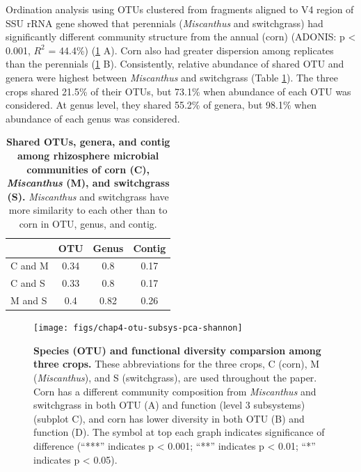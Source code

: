 \documentclass[]{msu-thesis}
\begin{document}
Ordination analysis using OTUs clustered from fragments aligned to V4
region of SSU rRNA gene showed that perennials (\textit{Miscanthus} and
switchgrass) had significantly different community structure from the
annual (corn) (ADONIS: p < 0.001, $R^2$ = 44.4\%) (\cref{fig:chap4Fig1}
A). Corn also had greater dispersion among replicates than the
perennials (\cref{fig:chap4Fig1} B). Consistently, relative abundance of
shared OTU and genera were highest between \textit{Miscanthus} and switchgrass
(Table \ref{tab:chap4TabS3}). The three crops shared 21.5\% of their
OTUs, but 73.1\% when abundance of each OTU was considered. At genus
level, they shared 55.2\% of genera, but 98.1\% when abundance of each
genus was considered.



\begin{table}[htbp]
  \centering
  \caption[Shared OTUs, genera, and contig among rhizosphere microbial
  communities of corn (C), \textit{Miscanthus} (M), and switchgrass
(S)]{\textbf{Shared OTUs, genera, and contig among rhizosphere microbial
  communities of corn (C), \textit{Miscanthus} (M), and switchgrass
(S).} \textit{Miscanthus} and switchgrass have more similarity to each
other than to corn in OTU, genus, and contig.}
    \begin{tabular}{|lccc|}
    \toprule
          & OTU   & Genus & Contig \\
    \midrule
    C and M & 0.34  & 0.8   & 0.17 \\
    C and S & 0.33  & 0.8   & 0.17 \\
    M and S & 0.4   & 0.82  & 0.26 \\
    \bottomrule
    \end{tabular}%
  \label{tab:chap4TabS3}%
\end{table}%





\begin{figure}[tbph!]
  \centering
  \texttt{[image: figs/chap4-otu-subsys-pca-shannon]}
  \caption[Species (OTU) and functional diversity comparsion among three
  crops]{\textbf{Species (OTU) and functional diversity comparsion among
  three crops.} These abbreviations for the three crops, C (corn), M
  (\textit{Miscanthus}), and S (switchgrass), are used throughout the
  paper. Corn has a different community composition from
  \textit{Miscanthus} and switchgrass in both OTU (A) and function
(level 3 subsystems) (subplot C), and corn has lower diversity in both
OTU (B) and function (D). The symbol at top each graph indicates
significance of difference (``***'' indicates p < 0.001; ``**''
indicates p < 0.01; ``*'' indicates p < 0.05).}
  \label{fig:chap4Fig1}
\end{figure}
\end{document}
